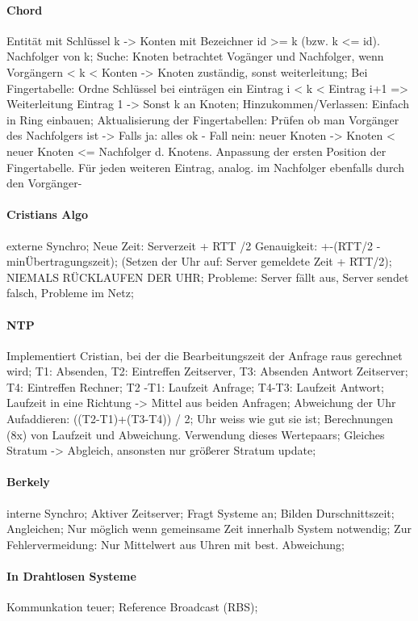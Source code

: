 \documentclass[pagesize,11pt,a4paper]{scrartcl}
\begin{document}
\paragraph*{Chord}
	Entität mit Schlüssel k -> Konten mit Bezeichner id >= k (bzw. k <= id). Nachfolger von k;
	Suche: Knoten betrachtet Vogänger und Nachfolger, wenn Vorgängern < k < Konten -> Knoten zuständig, sonst weiterleitung;
	Bei Fingertabelle: Ordne Schlüssel bei einträgen ein Eintrag i < k < Eintrag i+1 => Weiterleitung Eintrag 1 -> Sonst k an Knoten;
	Hinzukommen/Verlassen: Einfach in Ring einbauen; Aktualisierung der Fingertabellen: Prüfen ob man Vorgänger des Nachfolgers ist ->
		Falls ja: alles ok -
		Fall nein: neuer Knoten -> Knoten < neuer Knoten <= Nachfolger d. Knotens. Anpassung der ersten Position der Fingertabelle. Für jeden weiteren Eintrag, analog. im Nachfolger ebenfalls durch den Vorgänger-

\paragraph*{Cristians Algo}
	externe Synchro;
	Neue Zeit: Serverzeit + RTT /2  Genauigkeit: +-(RTT/2 - minÜbertragungszeit);
	(Setzen der Uhr auf: Server gemeldete Zeit + RTT/2);
	NIEMALS RÜCKLAUFEN DER UHR;
	Probleme: Server fällt aus, Server sendet falsch, Probleme im Netz;

\paragraph*{NTP}
	Implementiert Cristian, bei der die Bearbeitungszeit der Anfrage raus gerechnet wird;
	T1: Absenden, T2: Eintreffen Zeitserver, T3: Absenden Antwort Zeitserver; T4: Eintreffen Rechner;
	T2 -T1: Laufzeit Anfrage; T4-T3: Laufzeit Antwort;
	Laufzeit in eine Richtung -> Mittel aus beiden Anfragen;
	Abweichung der Uhr Aufaddieren: ((T2-T1)+(T3-T4)) / 2;
	Uhr weiss wie gut sie ist;
	Berechnungen (8x) von Laufzeit und Abweichung. Verwendung dieses Wertepaars;
	Gleiches Stratum -> Abgleich, ansonsten nur größerer Stratum update;

\paragraph*{Berkely}
	interne Synchro;
	Aktiver Zeitserver; Fragt Systeme an; Bilden Durschnittszeit; Angleichen;
	Nur möglich wenn gemeinsame Zeit innerhalb System notwendig;
	Zur Fehlervermeidung: Nur Mittelwert aus Uhren mit best. Abweichung;

\paragraph*{In Drahtlosen Systeme}
	Kommunkation teuer; Reference Broadcast (RBS);
\end{document}
